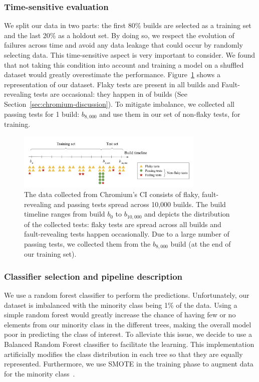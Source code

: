 \subsubsection{Time-sensitive evaluation}
We split our data in two parts: the first 80\% builds are selected as a training set and the last 20\% as a holdout set. By doing so, we respect the evolution of failures across time and avoid any data leakage that could occur by randomly selecting data. This time-sensitive aspect is very important to consider. We found that not taking this condition into account and training a model on a shuffled dataset would greatly overestimate the performance. Figure~\ref{fig:dataset} shows a representation of our dataset. Flaky tests are present in all builds and Fault-revealing tests are occasional: they happen in  of builds (See Section~\ref{sec:chromium-discussion}). To mitigate imbalance, we collected all passing tests for 1 build: $b_{8,000}$ and use them in our set of non-flaky tests, for training.

\begin{figure}[t]
\vspace{-1.4em}
\centering
\includegraphics[width=0.8\textwidth]{figures/chromium/dataset.png}
\vspace{-1.1em}
\caption{The data collected from Chromium's CI consists of flaky, fault-revealing and passing tests spread across 10,000 builds. The build timeline ranges from build \textit{$b_0$} to \textit{$b_{10,000}$} and depicts the distribution of the collected tests: flaky tests are spread across all builds and fault-revealing tests happen occasionally. Due to a large number of passing tests, we collected them from the \textit{$b_{8,000}$} build (\ie at the end of our training set).}
\label{fig:dataset}
\vspace{-0.2em}
\end{figure}

\subsubsection{Classifier selection and pipeline description}
We use a random forest classifier to perform the predictions. Unfortunately, our dataset is imbalanced with the minority class being 1\% of the data. Using a simple random forest would greatly increase the chance of having few or no elements from our minority class in the different trees, making the overall model poor in predicting the class of interest. To alleviate this issue, we decide to use a Balanced Random Forest classifier\cite{chen2004using} to facilitate the learning. This implementation artificially modifies the class distribution in each tree so that they are equally represented. Furthermore, we use SMOTE in the training phase to augment data for the minority class~\cite{smote}.

